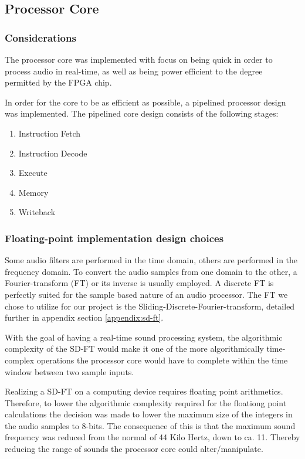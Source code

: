 \FloatBarrier
\subsection{Processor Core}\label{subsec:fpga-processor-core}

\subsubsection{Considerations}

The processor core was implemented with focus on being quick in order to process
audio in real-time, as well as being power efficient to the degree permitted by
the FPGA chip.

In order for the core to be as efficient as possible, a pipelined
processor design was implemented. The pipelined core design consists of the
following stages:


\begin{enumerate}
	\item Instruction Fetch \label{stage:if}
	\item Instruction Decode \label{stage:id}
	\item Execute \label{stage:ex}
	\item Memory \label{stage:mem}
	\item Writeback \label{stage:wb}
\end{enumerate}


\subsubsection{Floating-point implementation design choices}

Some audio filters are performed in the time domain, others are performed in the
frequency domain. To convert the audio samples from one domain to the other, a
Fourier-transform (FT) or its inverse is usually employed. A discrete FT is
perfectly suited for the sample based nature of an audio processor. The FT we
chose to utilize for our project is the
Sliding-Discrete-Fourier-transform, detailed further in appendix section
\ref{appendix:sd-ft}.

With the goal of having a real-time sound processing system, the algorithmic
complexity of the SD-FT would make it one of the more algorithmically
time-complex operations the processor core would have to complete within the
time window between two sample inputs.

Realizing a SD-FT on a computing device requires floating point arithmetics.
Therefore, to lower the algorithmic complexity required for the floationg point
calculations the decision was made to lower the maximum size of the integers in
the audio samples to 8-bits. The consequence of this is that the maximum sound
frequency was reduced from the normal of 44 Kilo Hertz, down to ca. 11. Thereby
reducing the range of sounds the processor core could alter/manipulate.
